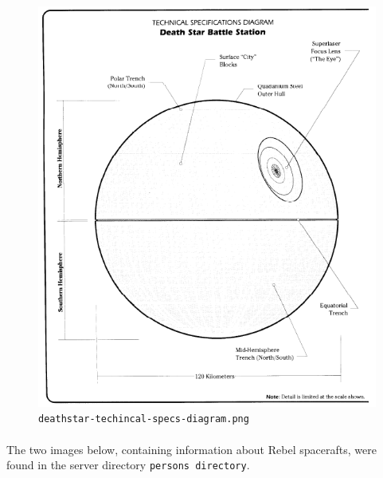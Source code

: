 \documentclass{article}
\begin{document}
\begin{figure}[H]
	\includegraphics[width=\linewidth]{resources/plans/deathstar-technical-specs-diagram.png}
	\caption{\texttt{deathstar-techincal-specs-diagram.png}}
	\label{fig:deathstar-technical-specs-diagram}
\end{figure}

\paragraph{}
The two images below, containing information about Rebel spacerafts, were found in the server directory \texttt{persons directory}.
\end{document}
